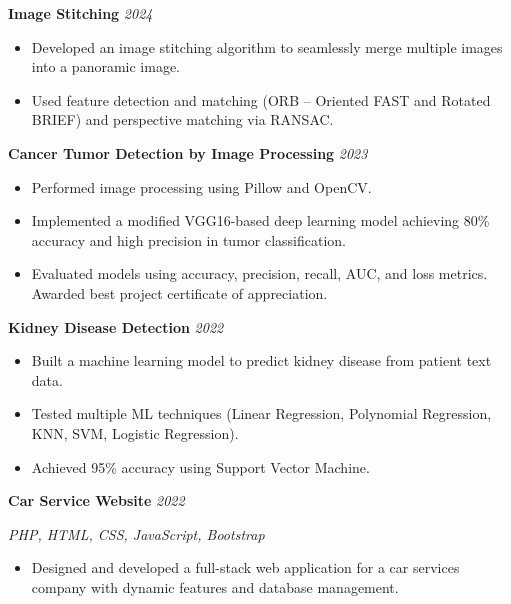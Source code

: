 \documentclass[a4paper,11pt]{article}
\newcommand{\cvproject}[2]{%
  \textbf{#1} \hfill \textit{#2}
  \vspace{2pt}
}
\begin{document}
\vspace{6pt}

\cvproject{Image Stitching}{2024}
\begin{itemize}[leftmargin=1.5em, topsep=2pt, itemsep=1pt]
  \item Developed an image stitching algorithm to seamlessly merge multiple images into a panoramic image.
  \item Used feature detection and matching (ORB -- Oriented FAST and Rotated BRIEF) and perspective matching via RANSAC.
\end{itemize}

\vspace{6pt}

\cvproject{Cancer Tumor Detection by Image Processing}{2023}
\begin{itemize}[leftmargin=1.5em, topsep=2pt, itemsep=1pt]
  \item Performed image processing using Pillow and OpenCV.
  \item Implemented a modified VGG16-based deep learning model achieving 80\% accuracy and high precision in tumor classification.
  \item Evaluated models using accuracy, precision, recall, AUC, and loss metrics. Awarded best project certificate of appreciation.
\end{itemize}

\vspace{6pt}

\cvproject{Kidney Disease Detection}{2022}
\begin{itemize}[leftmargin=1.5em, topsep=2pt, itemsep=1pt]
  \item Built a machine learning model to predict kidney disease from patient text data.
  \item Tested multiple ML techniques (Linear Regression, Polynomial Regression, KNN, SVM, Logistic Regression).
  \item Achieved 95\% accuracy using Support Vector Machine.
\end{itemize}

\vspace{6pt}

\cvproject{Car Service Website}{2022}
\textit{PHP, HTML, CSS, JavaScript, Bootstrap}
\begin{itemize}[leftmargin=1.5em, topsep=2pt, itemsep=1pt]
  \item Designed and developed a full-stack web application for a car services company with dynamic features and database management.
\end{itemize}
\end{document}
